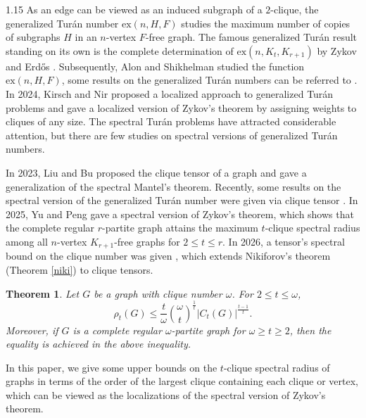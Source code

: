 \documentclass[preprint,12pt]{elsarticle1}
\newtheorem{thm}{Theorem}[section]
\numberwithin{equation}{section}
\begin{document}
\begin{spacing}{1.15}
As an edge can be viewed as an induced subgraph of a $2$-clique, the generalized Tur\'{a}n number $\mathrm{ex}(n,H,F)$ studies the maximum number of copies of subgraphs $H$ in an $n$-vertex $F$-free graph.
The famous generalized Tur\'{a}n result standing on its own is the complete determination of $\mathrm{ex}(n, K_t, K_{r+1})$ by Zykov \cite{zykov} and Erd\H{o}s \cite{erdos1}.
Subsequently, Alon and Shikhelman \cite{alon} studied the function $\mathrm{ex}(n,H,F)$, some results on the generalized Tur\'{a}n numbers can be referred to \cite{cheneujc2025,Gerbnerjctb2020,luojctb2018,maj}.
In 2024, Kirsch and Nir \cite{2local2024} proposed a localized approach to generalized Tur\'{a}n problems and gave a localized version of Zykov's theorem by assigning weights to cliques of any size.
The spectral Tur\'{a}n problems have attracted considerable attention, but there are few studies on spectral versions of generalized Tur\'{a}n numbers.

In 2023, Liu and Bu \cite{liujoco} proposed the clique tensor of a graph and gave a generalization of the spectral Mantel's theorem.
Recently, some results on the spectral version of the generalized Tur\'{a}n number were given via clique tensor \cite{liu2026dm,peng3,peng1}.
In 2025, Yu and Peng \cite{peng1} gave a spectral version of Zykov's theorem, which shows that the complete regular $r$-partite graph attains the maximum $t$-clique spectral radius among all $n$-vertex $K_{r+1}$-free graphs for $2\le t\le r$.
In 2026, a tensor's spectral bound on the clique number was given \cite{liu2026dm}, which extends Nikiforov's theorem (Theorem \ref{niki}) to clique tensors.

\begin{thm}\cite{liu2026dm}\label{liu2026dm}
Let $G$ be a graph with clique number $\omega$. For $2\le t\le \omega$,
$$\rho_{t}(G)\le \frac{t}{\omega}\binom{\omega}{t}^{\frac{1}{t}}|C_{t}(G)|^{\frac{t-1}{t}}.$$
Moreover, if $G$ is a complete regular $\omega$-partite graph for $\omega\ge t\ge 2$, then the equality is achieved in the above inequality.
\end{thm}

In this paper, we give some upper bounds on the $t$-clique spectral radius of graphs in terms of the order of the largest clique containing each clique or vertex, which can be viewed as the localizations of the spectral version of Zykov's theorem.


\end{spacing}
\end{document}
